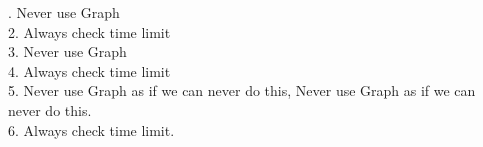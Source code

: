 . Never use Graph\\
2. Always check time limit\\
3. Never use Graph\\
4. Always check time limit\\
5. Never use Graph as if we can never do this, Never use Graph as if we can never do this.\\
6. Always check time limit.\\ \\